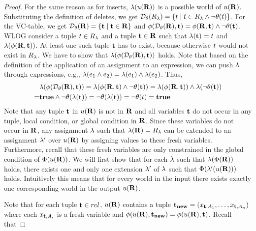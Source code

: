 {\begin{proof}
%
For the same reason as for inserts, $\lambda(u(\mathbf{R}))$ is a possible world of $u(\mathbf{R})$.
Substituting the definition of deletes, we get $\mathcal{D}_{\theta}(R_{\lambda}) = \{ t \mid t \in R_{\lambda} \land \neg \theta(t) \}$. For the VC-table, we get $\mathcal{D}_{\theta}(\mathbf{R}) = \{ \mathbf{t} \mid \mathbf{t} \in \mathbf{R} \}$ and $\phi(\mathcal{D}_{\theta}(\mathbf{R}), \mathbf{t}) = \phi(\mathbf{R}, \mathbf{t}) \land \neg \theta(\mathbf{t})$. WLOG consider a tuple $t \in R_{\lambda}$ and a tuple $\mathbf{t} \in \mathbf{R}$ such that $\lambda(\mathbf{t}) = t$ and $\lambda(\phi(\mathbf{R}, \mathbf{t}))$. At least one such tuple $\mathbf{t}$ has to exist, because otherwise $t$ would not exist in $R_{\lambda}$. We have to show that $\lambda(\phi(\mathcal{D}_{\theta}(\mathbf{R}), \mathbf{t}))$ holds. %
Note that based on the definition of the application of an assignment to an expression, we can push $\lambda$ through expressions, e.g., $\lambda(e_1 \land e_2) = \lambda(e_1) \land \lambda(e_2)$. Thus,
%
\begin{align*}
  &\lambda(\phi(\mathcal{D}_{\theta}(\mathbf{R}), \mathbf{t}))
  = \lambda(\phi(\mathbf{R}, \mathbf{t}) \land \neg \theta(\mathbf{t}))
  = \lambda(\phi(\mathbf{R}, \mathbf{t})) \land \lambda(\neg \theta(\mathbf{t}))\\
  = &\mathbf{true} \land \neg \theta(\lambda(\mathbf{t}))
  = \neg \theta(\lambda(\mathbf{t}))
  = \neg \theta(t) = \mathbf{true}
\end{align*}
%
%
Note that any tuple $\mathbf{t}$ in $u(\mathbf{R})$ is not in $\mathbf{R}$ and all variables $\mathbf{t}$ do not occur in any tuple, local condition, or global condition in $\mathbf{R}$. Since these variables do not occur in $\mathbf{R}$, any assignment $\lambda$ such that $\lambda(\mathbf{R}) = R_{\lambda}$ can be extended to an assignment $\lambda'$ over $u(\mathbf{R})$ by assigning values to these fresh variables. Furthermore, recall that these fresh variables are only constrained in the global condition of $\Phi(u(\mathbf{R}))$. We will first show that for each $\lambda$ such that $\lambda(\Phi(\mathbf{R}))$ holds, there exists one and only one extension $\lambda'$ of $\lambda$ such that $\Phi(\lambda'(u(\mathbf{R})))$ holds. Intuitively this means that for every world in the input there exists exactly one corresponding world in the output $u(\mathbf{R})$.

Note that for each tuple $\mathbf{t} \in rel$, $u(\mathbf{R})$ contains a tuple $\mathbf{t_{new}} = (x_{\mathbf{t},A_1}, \ldots, x_{\mathbf{t},A_n})$ where each $x_{\mathbf{t},A_i}$ is a fresh variable and $\phi(u(\mathbf{R}),\mathbf{t_{new}}) = \phi(u(\mathbf{R}),\mathbf{t})$. Recall that


\end{proof}}
